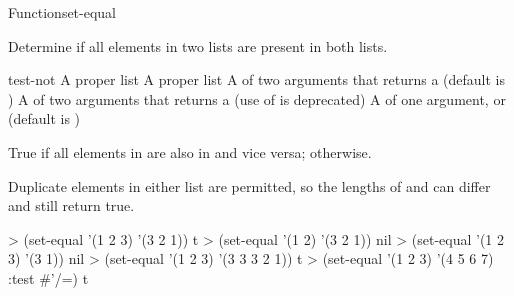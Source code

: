 \documentclass[10pt,twoside,english,pdftex]{article}
\begin{document}
\begin{functiondoc}{Function}{set-equal}{
      \returns{} }

\fnsyntax

\fnpurpose Determine if all elements in two lists are present in both lists.

\fnpackage {}

\fnmodule {}

\fnargs
\begin{args}{test-not}
\arg[list-1] A proper list
\arg[list-2] A proper list
\arg[test] A  of two arguments that returns a
 (default is ) 
 A  of two arguments that returns a
 (use of  is deprecated)
\arg[key] A  of one argument, or \nil{} (default is \nil)
\end{args}

\fnreturns True if all elements in  are also in
 and vice versa; \nil{} otherwise.

\fndescription Duplicate elements in either list are permitted, so the
lengths of  and  can differ and still return
true.

\fnexamples
\begin{example}
> (set-equal '(1 2 3) '(3 2 1))
t
> (set-equal '(1 2) '(3 2 1))
nil
> (set-equal '(1 2 3) '(3 1))
nil
> (set-equal '(1 2 3) '(3 3 3 2 1))
t
> (set-equal '(1 2 3) '(4 5 6 7) :test #'/=)
t
\end{example}

\end{functiondoc}

\end{document}
